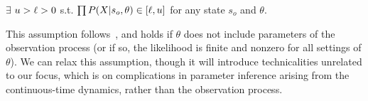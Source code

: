 

\begin{assumption}
$\exists$ $ u > \ell > 0$ s.t.
$\prod P(X | s_o, \theta) \in [\ell, u]$ for any state $s_o$ and $\theta$.%
  \label{asmp:obs_bnd}
\end{assumption}
\noindent This assumption follows~\cite{miasojedow2017}, and holds if
$\theta$ does not include parameters of the observation process (or if so,
the likelihood is finite and nonzero for all settings of $\theta$). We can relax this assumption,
though it will introduce technicalities unrelated to our focus, which 
is on complications in parameter inference arising from the continuous-time
dynamics, rather than the observation process. 

